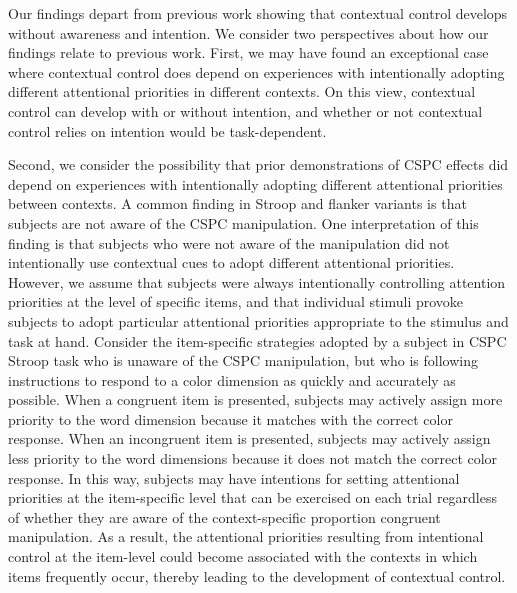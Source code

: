 \documentclass[english,,man,floatsintext]{apa6}
\begin{document}
Our findings depart from previous work showing that contextual control
develops without awareness and intention. We consider two perspectives
about how our findings relate to previous work. First, we may have found
an exceptional case where contextual control does depend on experiences
with intentionally adopting different attentional priorities in
different contexts. On this view, contextual control can develop with or
without intention, and whether or not contextual control relies on
intention would be task-dependent.

Second, we consider the possibility that prior demonstrations of CSPC
effects did depend on experiences with intentionally adopting different
attentional priorities between contexts. A common finding in Stroop and
flanker variants is that subjects are not aware of the CSPC
manipulation. One interpretation of this finding is that subjects who
were not aware of the manipulation did not intentionally use contextual
cues to adopt different attentional priorities. However, we assume that
subjects were always intentionally controlling attention priorities at
the level of specific items, and that individual stimuli provoke
subjects to adopt particular attentional priorities appropriate to the
stimulus and task at hand. Consider the item-specific strategies adopted
by a subject in CSPC Stroop task who is unaware of the CSPC
manipulation, but who is following instructions to respond to a color
dimension as quickly and accurately as possible. When a congruent item
is presented, subjects may actively assign more priority to the word
dimension because it matches with the correct color response. When an
incongruent item is presented, subjects may actively assign less
priority to the word dimensions because it does not match the correct
color response. In this way, subjects may have intentions for setting
attentional priorities at the item-specific level that can be exercised
on each trial regardless of whether they are aware of the
context-specific proportion congruent manipulation. As a result, the
attentional priorities resulting from intentional control at the
item-level could become associated with the contexts in which items
frequently occur, thereby leading to the development of contextual
control.
\end{document}
